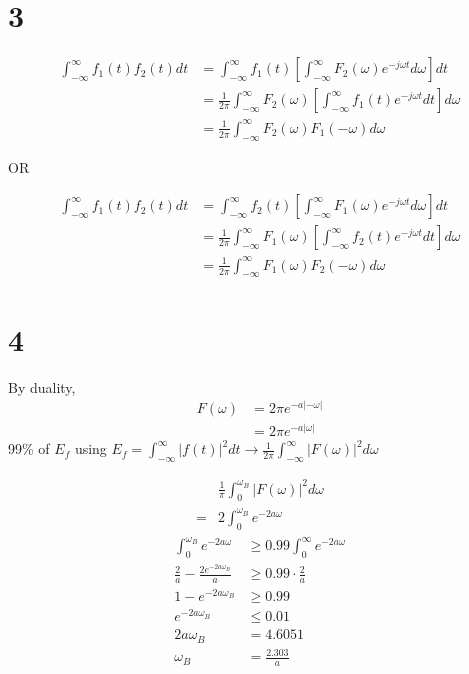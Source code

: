 \documentclass{article}
\begin{document}
\begin{multicols}{2}
\section*{3}
\begin{align*}
\int_{-\infty}^\infty f_1(t)f_2(t)dt &= \int_{-\infty}^\infty f_1(t)\left[ \int_{-\infty}^\infty F_2(\omega)e^{-j\omega t} d\omega \right]dt\\
&= \frac{1}{2\pi} \int_{-\infty}^\infty F_2(\omega)\left[\int_{-\infty}^\infty f_1(t)e^{-j\omega t}dt\right]d\omega\\
&= \boxed{\frac{1}{2\pi} \int_{-\infty}^\infty F_2(\omega)F_1(-\omega)d\omega}
\end{align*}

OR

\begin{align*}
\int_{-\infty}^\infty f_1(t)f_2(t)dt &= \int_{-\infty}^\infty f_2(t)\left[ \int_{-\infty}^\infty F_1(\omega)e^{-j\omega t} d\omega \right]dt\\
&= \frac{1}{2\pi} \int_{-\infty}^\infty F_1(\omega)\left[\int_{-\infty}^\infty f_2(t)e^{-j\omega t}dt\right]d\omega\\
&= \boxed{\frac{1}{2\pi} \int_{-\infty}^\infty F_1(\omega)F_2(-\omega)d\omega}
\end{align*}
\section*{4}
By duality,
\begin{align*}
    F(\omega) &=2\pi e^{-a|-\omega|}\\
    &= 2\pi e^{-a|\omega|}
\end{align*}
99\% of $E_f$ using $E_f = \int_{-\infty}^\infty|f(t)|^2 dt \rightarrow \frac{1}{2\pi}\int_{-\infty}^\infty |F(\omega)|^2 d\omega$

\begin{align*}
    &\frac{1}{\pi}\int_0^{\omega_B} |F(\omega)|^2 d\omega\\
    =&2\int_0^{\omega_B}e^{-2a\omega}
\end{align*}
\begin{align*}
\int_0^{\omega_B} e^{-2a\omega} &\geq 0.99 \int_0^{\infty} e^{-2a\omega}\\
\frac{2}{a}-\frac{2e^{-2a\omega_B}}{a} &\geq 0.99\cdot\frac{2}{a}\\
1-e^{-2a\omega_B} &\geq 0.99\\
e^{-2a\omega_B} &\leq 0.01\\
2a\omega_B &= 4.6051\\
\omega_B &= \boxed{\frac{2.303}{a}}
\end{align*}

\end{multicols}
\end{document}
